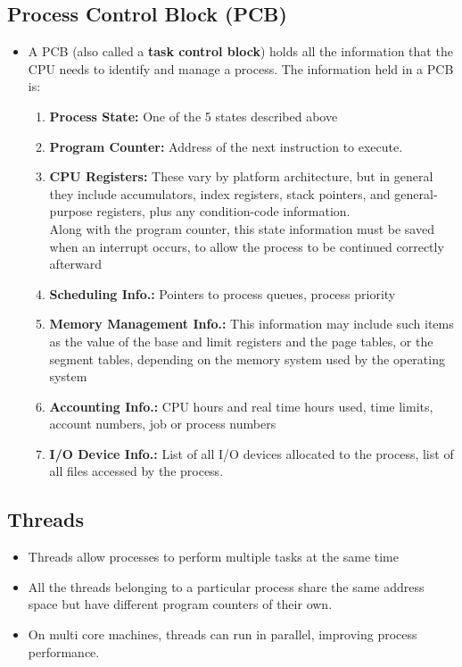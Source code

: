 \documentclass{article}
\theoremstyle{plain}
\theoremstyle{definition}
\begin{document}
\subsection{Process Control Block (PCB)}
\begin{itemize}
    \item A PCB (also called a \textbf{task control block}) holds all the information that the CPU needs to identify and manage a process. The information held in a PCB is:
    \begin{enumerate}
        \item \textbf{Process State:} One of the 5 states described above
        
        \item \textbf{Program Counter:} Address of the next instruction to execute. 
        
        \item \textbf{CPU Registers:} These vary by platform architecture, but in general they include accumulators, index registers,
        stack pointers, and general-purpose registers, plus any condition-code
        information. \\
        Along with the program counter, this state information must
        be saved when an interrupt occurs, to allow the process to be continued
        correctly afterward
        
        \item \textbf{Scheduling Info.:} Pointers to process queues, process priority
        
        \item \textbf{Memory Management Info.:} This information may include such
        items as the value of the base and limit registers and the page tables, or the
        segment tables, depending on the memory system used by the operating
        system
        
        \item \textbf{Accounting Info.:} CPU hours and real time hours used, time limits, account numbers, job or process numbers
        
        \item \textbf{I/O Device Info.:} List of all I/O devices allocated to the process, list of all files accessed by the process. 
    \end{enumerate}
\end{itemize}

\subsection{Threads}
\begin{itemize}
    \item Threads allow processes to perform multiple tasks at the same time
    
    \item All the threads belonging to a particular process share the same address space but have different program counters of their own.
    
    \item On multi core machines, threads can run in parallel, improving process performance.
\end{itemize}
\end{document}
